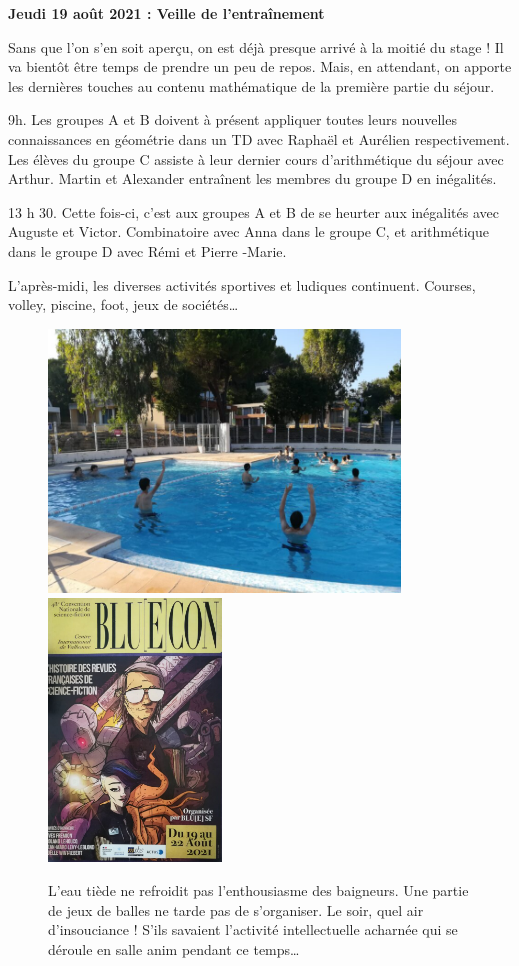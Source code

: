 \begin{center}
{\textbf{Jeudi 19 août 2021 : Veille de l’entraînement}}
\end{center}
\vspace{2mm}

Sans que l’on s’en soit aperçu, on est déjà presque arrivé à la moitié du stage ! Il va bientôt être temps de prendre un peu de repos. Mais, en attendant, on apporte les dernières touches au contenu mathématique de la première partie du séjour.

9h. Les groupes A et B doivent à présent appliquer toutes leurs nouvelles connaissances en géométrie dans un TD avec Raphaël et Aurélien respectivement. Les élèves du groupe C assiste à leur dernier cours d’arithmétique du séjour avec Arthur. Martin et Alexander entraînent les membres du groupe D en inégalités.

13 h 30. Cette fois-ci, c’est aux groupes A et B de se heurter aux inégalités avec Auguste et Victor. Combinatoire avec Anna dans le groupe C, et arithmétique dans le groupe D avec Rémi et Pierre -Marie.

L’après-midi, les diverses activités sportives et ludiques continuent. Courses, volley, piscine, foot, jeux de sociétés…

\begin{figure}[H]
\centering\includegraphics[height=7cm]{CR-19-0.jpg}\hspace{2cm}\includegraphics[height=7cm]{CR-19-1.jpg}
\caption{L’eau tiède ne refroidit pas l’enthousiasme des baigneurs. Une partie de jeux de balles ne tarde pas de s’organiser. Le soir, quel air d’insouciance ! S’ils savaient l'activité intellectuelle acharnée qui se déroule en salle anim pendant ce temps…}
\end{figure}

